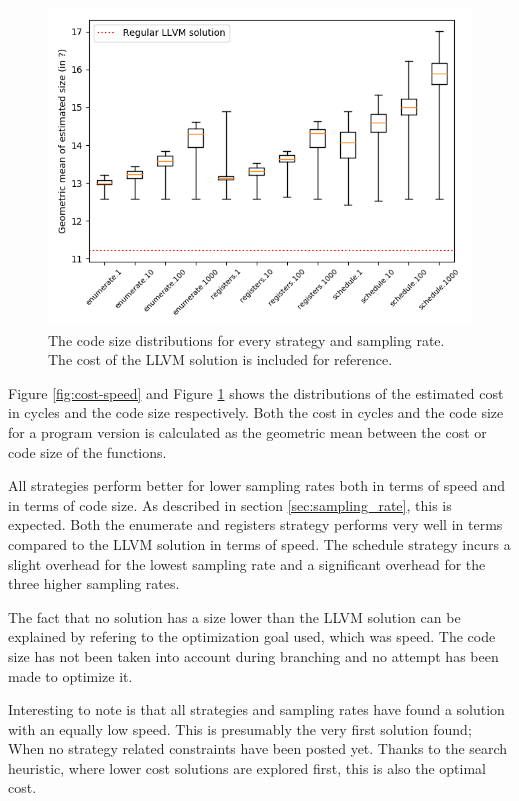 \begin{figure}[h]
	\centering
	\includegraphics[width=\textwidth,height=0.5\textheight]{results/figures/cost_size}
	\caption{The code size distributions for every strategy and sampling rate. The cost of the LLVM solution is included for reference.}
	\label{fig:cost-size}
\end{figure}

Figure \ref{fig:cost-speed} and Figure \ref{fig:cost-size} shows the distributions of the
estimated cost in cycles and the code size respectively. Both the cost in cycles and the
code size for a program version is calculated as the geometric mean between the cost or
code size of the functions.

All strategies perform better for lower sampling rates both in terms of speed and in terms
of code size. As described in section \ref{sec:sampling_rate}, this is expected. Both the
enumerate and registers strategy performs very well in terms compared to the LLVM solution
in terms of speed. The schedule strategy incurs a slight overhead for the lowest sampling
rate and a significant overhead for the three higher sampling rates.

The fact that no solution has a size lower than the LLVM solution can be explained by
refering to the optimization goal used, which was speed. The code size has not been taken
into account during branching and no attempt has been made to optimize it.

Interesting to note is that all strategies and sampling rates have found a solution with
an equally low speed. This is presumably the very first solution found; When no strategy
related constraints have been posted yet. Thanks to the search heuristic, where lower cost
solutions are explored first, this is also the optimal cost.

